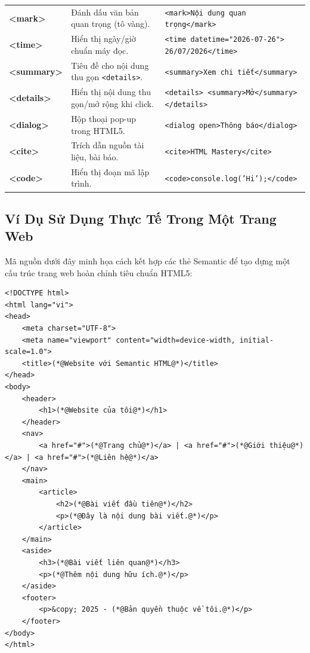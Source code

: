 \documentclass[11pt,oneside]{book}
\newcommand{\codeinline}[1]{\textcolor{accentOrange}{\texttt{#1}}}
\begin{document}
\begin{prettyTableBox}
\begin{tabularx}{\linewidth}{>{\ttfamily\bfseries\color{primaryBlue}}K{2.2cm} Z Z}
<mark> & Đánh dấu văn bản quan trọng (tô vàng). & \codeinline{<mark>Nội dung quan trọng</mark>} \\

<time> & Hiển thị ngày/giờ chuẩn máy đọc. & \codeinline{<time datetime="2026-07-26">}\newline\codeinline{  26/07/2026</time>} \\

<summary> & Tiêu đề cho nội dung thu gọn \codeinline{<details>}. & \codeinline{<summary>Xem chi tiết</summary>} \\

<details> & Hiển thị nội dung thu gọn/mở rộng khi click. & \codeinline{<details>}\newline\codeinline{  <summary>Mở</summary>}\newline\codeinline{</details>} \\

<dialog> & Hộp thoại pop-up trong HTML5. & \codeinline{<dialog open>Thông báo</dialog>} \\

<cite> & Trích dẫn nguồn tài liệu, bài báo. & \codeinline{<cite>HTML Mastery</cite>} \\

<code> & Hiển thị đoạn mã lập trình. & \codeinline{<code>console.log('Hi');</code>} \\
\end{tabularx}
\end{prettyTableBox}

\subsection{Ví Dụ Sử Dụng Thực Tế Trong Một Trang Web}

Mã nguồn dưới đây minh họa cách kết hợp các thẻ Semantic để tạo dựng một cấu trúc trang web hoàn chỉnh tiêu chuẩn HTML5:

\begin{codeWindow}
\begin{lstlisting}[language=HTML5]
<!DOCTYPE html>
<html lang="vi">
<head>
    <meta charset="UTF-8">
    <meta name="viewport" content="width=device-width, initial-scale=1.0">
    <title>(*@Website với Semantic HTML@*)</title>
</head>
<body>
    <header>
        <h1>(*@Website của tôi@*)</h1>
    </header>
    <nav>
        <a href="#">(*@Trang chủ@*)</a> | <a href="#">(*@Giới thiệu@*)</a> | <a href="#">(*@Liên hệ@*)</a>
    </nav>
    <main>
        <article>
            <h2>(*@Bài viết đầu tiên@*)</h2>
            <p>(*@Đây là nội dung bài viết.@*)</p>
        </article>
    </main>
    <aside>
        <h3>(*@Bài viết liên quan@*)</h3>
        <p>(*@Thêm nội dung hữu ích.@*)</p>
    </aside>
    <footer>
        <p>&copy; 2025 - (*@Bản quyền thuộc về tôi.@*)</p>
    </footer>
</body>
</html>
\end{lstlisting}
\end{codeWindow}
\end{document}
